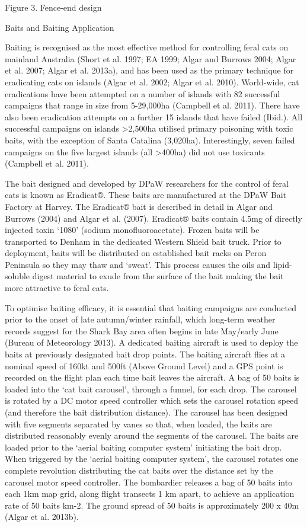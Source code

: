 \documentclass[version=last,
    paper=a4,                               %
    10pt,                                   %
    dvipsnames,
    oneside,                              %
    headings=openany,                       %
    open=any,
    BCOR=7mm,                               %
    DIV=15,     %
]{scrbook}
\begin{document}
Figure 3. Fence-end design

Baits and Baiting Application

Baiting is recognised as the most effective method for controlling feral
cats on mainland Australia (Short et al. 1997; EA 1999; Algar and
Burrows 2004; Algar et al. 2007; Algar et al. 2013a), and has been used
as the primary technique for eradicating cats on islands (Algar et al.
2002; Algar et al. 2010). World-wide, cat eradications have been
attempted on a number of islands with 82 successful campaigns that range
in size from 5-29,000ha (Campbell et al. 2011). There have also been
eradication attempts on a further 15 islands that have failed (Ibid.).
All successful campaigns on islands \textgreater{}2,500ha utilised
primary poisoning with toxic baits, with the exception of Santa Catalina
(3,020ha). Interestingly, seven failed campaigns on the five largest
islands (all \textgreater{}400ha) did not use toxicants (Campbell et al.
2011).

The bait designed and developed by DPaW researchers for the control of
feral cats is known as Eradicat®. These baits are manufactured at the
DPaW Bait Factory at Harvey. The Eradicat® bait is described in detail
in Algar and Burrows (2004) and Algar et al. (2007). Eradicat® baits
contain 4.5mg of directly injected toxin `1080' (sodium
monofluoroacetate). Frozen baits will be transported to Denham in the
dedicated Western Shield bait truck. Prior to deployment, baits will be
distributed on established bait racks on Peron Peninsula so they may
thaw and `sweat'. This process causes the oils and lipid-soluble digest
material to exude from the surface of the bait making the bait more
attractive to feral cats.

To optimise baiting efficacy, it is essential that baiting campaigns are
conducted prior to the onset of late autumn/winter rainfall, which
long-term weather records suggest for the Shark Bay area often begins in
late May/early June (Bureau of Meteorology 2013). A dedicated baiting
aircraft is used to deploy the baits at previously designated bait drop
points. The baiting aircraft flies at a nominal speed of 160kt and 500ft
(Above Ground Level) and a GPS point is recorded on the flight plan each
time bait leaves the aircraft. A bag of 50 baits is loaded into the `cat
bait carousel', through a funnel, for each drop. The carousel is rotated
by a DC motor speed controller which sets the carousel rotation speed
(and therefore the bait distribution distance). The carousel has been
designed with five segments separated by vanes so that, when loaded, the
baits are distributed reasonably evenly around the segments of the
carousel. The baits are loaded prior to the `aerial baiting computer
system' initiating the bait drop. When triggered by the `aerial baiting
computer system', the carousel rotates one complete revolution
distributing the cat baits over the distance set by the carousel motor
speed controller. The bombardier releases a bag of 50 baits into each
1km map grid, along flight transects 1 km apart, to achieve an
application rate of 50 baits km-2. The ground spread of 50 baits is
approximately 200 x 40m (Algar et al. 2013b).
\end{document}
